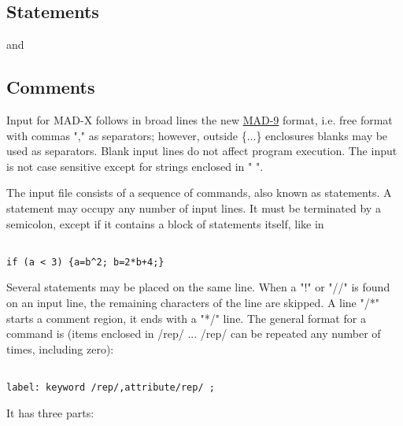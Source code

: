 




\subsection{Statements} and 

\subsection{Comments}
 Input for MAD-X follows in broad lines the new \href{http://cern.ch/mad9}{MAD-9} format, i.e. free format with commas "," as separators; however, outside \{...\} enclosures blanks may be used as separators. Blank input lines do not affect program execution. The input is not case sensitive except for strings enclosed in " ". 

 The input file consists of a sequence of commands, also known as statements. A statement may occupy any number of  input lines. It must be terminated by a semicolon, except if it contains a block of statements itself, like in 
\begin{verbatim}

if (a < 3) {a=b^2; b=2*b+4;}
\end{verbatim}

Several statements may be placed on the same line.
When a "!" or "//" is found on an input line,
the remaining characters of the line are skipped.
A line "/*" starts a comment region, it ends with a "*/" line.
The general format for a command is (items enclosed in /rep/ ... /rep/
can be repeated any number of times, including zero):

\begin{verbatim}

label: keyword /rep/,attribute/rep/ ;
\end{verbatim}
It has three parts:

